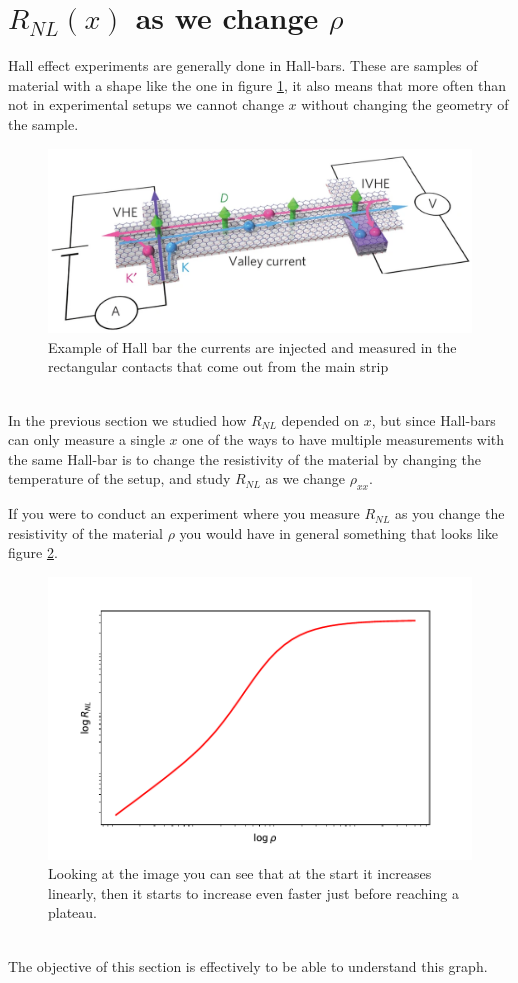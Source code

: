 \section{$R_{NL}(x)$ as we change $\rho$}
Hall effect experiments are generally done in Hall-bars. These are samples of material with a shape like the one in figure \ref{fig:hall-bar}, it also means that more often than not in experimental setups we cannot change $x$ without changing the geometry of the sample.
\begin{figure}[h!]
    \centering
    \includegraphics[width=\linewidth]{Immagini/rnl/hallbarbrutta.png}
    \caption{Example of Hall bar the currents are injected and measured in the rectangular contacts that come out from the main strip}
    \label{fig:hall-bar}
\end{figure}\\
In the previous section we studied how $R_{NL}$ depended on $x$, but since Hall-bars can only measure a single $x$ one of the ways to have multiple measurements with the same Hall-bar is to change the resistivity of the material by changing the temperature of the setup, and study $R_{NL}$ as we change $\rho_{xx}$.


If you were to conduct an experiment where you measure $R_{NL}$ as you change the resistivity of the material $\rho$ you would have in general something that looks like figure \ref{fig:rho0}.
\begin{figure}[h!]
    \centering
    \includegraphics[width=\linewidth]{Immagini/rnl/rho0.pdf}
    \caption{Looking at the image you can see that at the start it increases linearly, then it starts to increase even faster just before reaching a plateau.}
    \label{fig:rho0}
\end{figure}\\
The objective of this section is effectively to be able to understand this graph.

